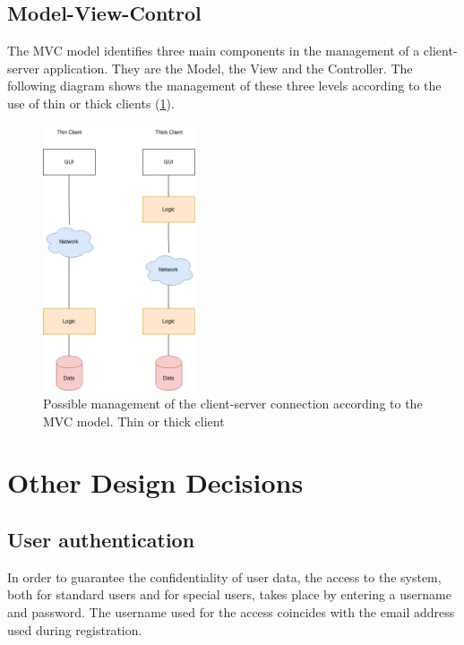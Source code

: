 \subsection{Model-View-Control}
The MVC model identifies three main components in the management of a client-server application. They are the Model, the View and the Controller.
The following diagram shows the management of these three levels according to the use of thin or thick clients (\ref{img:client_server}).

\begin{figure}[H]
  \begin{center}
  	\includegraphics[width=0.4\textwidth]{./img/client_server.png}
    \hspace{0.05\linewidth}
    \centering
    \caption{Possible management of the client-server connection according to the MVC model. Thin or thick client}
		\label{img:client_server}
    \end{center}
\end{figure}


\section{Other Design Decisions}
\subsection{User authentication}
In order to guarantee the confidentiality of user data, the access to the system, both for standard users and for special users, takes place by entering a username and password.
The username used for the access coincides with the email address used during registration.

